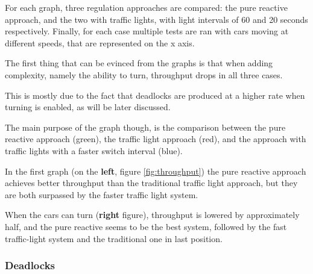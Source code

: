 For each graph, three regulation approaches are compared: the pure reactive approach, and the two with traffic lights, with light intervals of 60 and 20 seconds respectively.
Finally, for each case multiple tests are ran with cars moving at different speeds, that are represented on the x axis.
\newline

The first thing that can be evinced from the graphs is that when adding complexity, namely the ability to turn, throughput drops in all three cases.


This is mostly due to the fact that deadlocks are produced at a higher rate when turning is enabled, as will be later discussed.

The main purpose of the graph though, is the comparison between the pure reactive approach (green), the traffic light approach (red), and the approach with traffic lights with a faster switch interval (blue).

In the first graph (on the \textbf{left}, figure \ref{fig:throughput}) the pure reactive approach achieves better throughput than the traditional traffic light approach, but they are both surpassed by the faster traffic light system.

When the cars can turn (\textbf{right} figure), throughput is lowered by approximately half, and the pure reactive seems to be the best system, followed by the fast traffic-light system and the traditional one in last position.

\subsubsection{Deadlocks}


